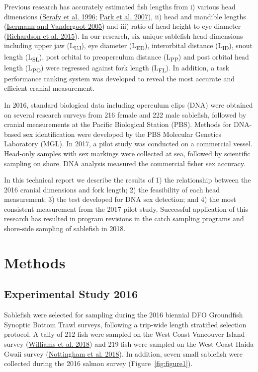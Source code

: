 \documentclass[12pt]{article}\usepackage[]{graphicx}\usepackage[]{color}
\begin{document}
Previous research has accurately estimated fish lengths from i) various head dimensions (\protect\hyperlink{ref-Serafy1996}{Serafy et al. 1996}; \protect\hyperlink{ref-Park2007}{Park et al. 2007}), ii) head and mandible lengths (\protect\hyperlink{ref-Isermann2005}{Isermann and Vandergoot 2005}) and iii) ratio of head height to eye diameter (\protect\hyperlink{ref-Richardson2015}{Richardson et al. 2015}). In our research, six unique sablefish head dimensions including upper jaw (L\textsubscript{UJ}), eye diameter (L\textsubscript{ED}), interorbital distance (L\textsubscript{ID}), snout length (L\textsubscript{SL}), post orbital to preoperculum distance (L\textsubscript{PP}) and post orbital head length (L\textsubscript{PO}) were regressed against fork length (L\textsubscript{FL}). In addition, a task performance ranking system was developed to reveal the most accurate and efficient cranial measurement.

In 2016, standard biological data including operculum clips (DNA) were obtained on several research surveys from 216 female and 222 male sablefish, followed by cranial measurements at the Pacific Biological Station (PBS). Methods for DNA-based sex identification were developed by the PBS Molecular Genetics Laboratory (MGL). In 2017, a pilot study was conducted on a commercial vessel. Head-only samples with sex markings were collected at sea, followed by scientific sampling on shore. DNA analysis measured the commercial fisher sex accuracy.

In this technical report we describe the results of 1) the relationship between the 2016 cranial dimensions and fork length; 2) the feasibility of each head measurement; 3) the test developed for DNA sex detection; and 4) the most consistent measurement from the 2017 pilot study. Successful application of this research has resulted in program revisions in the catch sampling programs and shore-side sampling of sablefish in 2018.

\hypertarget{methods}{%
\section{Methods}\label{methods}}

\hypertarget{experimental-study-2016}{%
\subsection{Experimental Study 2016}\label{experimental-study-2016}}

Sablefish were selected for sampling during the 2016 biennial DFO Groundfish Synoptic Bottom Trawl surveys, following a trip-wide length stratified selection protocol. A tally of 212 fish were sampled on the West Coast Vancouver Island survey (\protect\hyperlink{ref-Williams2018}{Williams et al. 2018}) and 219 fish were sampled on the West Coast Haida Gwaii survey (\protect\hyperlink{ref-Nottingham2018}{Nottingham et al. 2018}). In addition, seven small sablefish were collected during the 2016 salmon survey (Figure~\ref{fig:figure1}).
\end{document}
